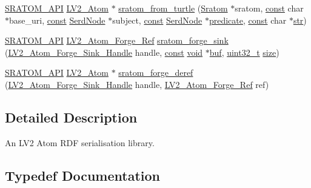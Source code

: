 \begin{DoxyCompactItemize}
\item 
\hyperlink{sratom_8h_a985b35a1a85570afea3bd031d6c8e72d}{S\+R\+A\+T\+O\+M\+\_\+\+A\+PI} \hyperlink{struct_l_v2___atom}{L\+V2\+\_\+\+Atom} $\ast$ \hyperlink{group__sratom_gabb8be4254715e569531159e21cf27c17}{sratom\+\_\+from\+\_\+turtle} (\hyperlink{group__sratom_gaff6a49d547dbfe9f8d910f9b1ae98494}{Sratom} $\ast$sratom, \hyperlink{getopt1_8c_a2c212835823e3c54a8ab6d95c652660e}{const} char $\ast$base\+\_\+uri, \hyperlink{getopt1_8c_a2c212835823e3c54a8ab6d95c652660e}{const} \hyperlink{struct_serd_node}{Serd\+Node} $\ast$subject, \hyperlink{getopt1_8c_a2c212835823e3c54a8ab6d95c652660e}{const} \hyperlink{struct_serd_node}{Serd\+Node} $\ast$\hyperlink{xlmath_8c_a767c5fa064d0a1e1f8b447769f1a890b}{predicate}, \hyperlink{getopt1_8c_a2c212835823e3c54a8ab6d95c652660e}{const} char $\ast$\hyperlink{sndfile__save_8m_a4b99ff73a8a869319570237b5c57ab03}{str})
\item 
\hyperlink{sratom_8h_a985b35a1a85570afea3bd031d6c8e72d}{S\+R\+A\+T\+O\+M\+\_\+\+A\+PI} \hyperlink{forge_8h_a272218ba2d84c66ec458cf7069933ea9}{L\+V2\+\_\+\+Atom\+\_\+\+Forge\+\_\+\+Ref} \hyperlink{group__sratom_ga81b7aa6812793fd2f905432ac90eb27b}{sratom\+\_\+forge\+\_\+sink} (\hyperlink{forge_8h_a19874fcf063508aa5069ee22fd494676}{L\+V2\+\_\+\+Atom\+\_\+\+Forge\+\_\+\+Sink\+\_\+\+Handle} handle, \hyperlink{getopt1_8c_a2c212835823e3c54a8ab6d95c652660e}{const} \hyperlink{sound_8c_ae35f5844602719cf66324f4de2a658b3}{void} $\ast$\hyperlink{xlstr_8c_a781718f5b53a876fe91c424c4607fa8f}{buf}, \hyperlink{lib-src_2ffmpeg_2win32_2stdint_8h_a6eb1e68cc391dd753bc8ce896dbb8315}{uint32\+\_\+t} \hyperlink{group__lavu__mem_ga854352f53b148adc24983a58a1866d66}{size})
\item 
\hyperlink{sratom_8h_a985b35a1a85570afea3bd031d6c8e72d}{S\+R\+A\+T\+O\+M\+\_\+\+A\+PI} \hyperlink{struct_l_v2___atom}{L\+V2\+\_\+\+Atom} $\ast$ \hyperlink{group__sratom_gaf2e397c53d1ca4eed848986d733d300b}{sratom\+\_\+forge\+\_\+deref} (\hyperlink{forge_8h_a19874fcf063508aa5069ee22fd494676}{L\+V2\+\_\+\+Atom\+\_\+\+Forge\+\_\+\+Sink\+\_\+\+Handle} handle, \hyperlink{forge_8h_a272218ba2d84c66ec458cf7069933ea9}{L\+V2\+\_\+\+Atom\+\_\+\+Forge\+\_\+\+Ref} ref)
\end{DoxyCompactItemize}


\subsection{Detailed Description}
An L\+V2 Atom R\+DF serialisation library. 

\subsection{Typedef Documentation}

